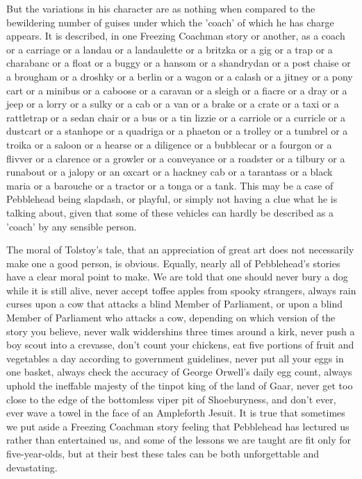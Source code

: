 But the variations in his character are as nothing when compared to the bewildering number of guises under which the 'coach' of which he has charge appears. It is described, in one Freezing Coachman story or another, as a coach or a carriage or a landau or a landaulette or a britzka or a gig or a trap or a charabanc or a float or a buggy or a hansom or a shandrydan or a post chaise or a brougham or a droshky or a berlin or a wagon or a calash or a jitney or a pony cart or a minibus or a caboose or a caravan or a sleigh or a fiacre or a dray or a jeep or a lorry or a sulky or a cab or a van or a brake or a crate or a taxi or a rattletrap or a sedan chair or a bus or a tin lizzie or a carriole or a curricle or a dustcart or a stanhope or a quadriga or a phaeton or a trolley or a tumbrel or a troika or a saloon or a hearse or a diligence or a bubblecar or a fourgon or a flivver or a clarence or a growler or a conveyance or a roadster or a tilbury or a runabout or a jalopy or an oxcart or a hackney cab or a tarantass or a black maria or a barouche or a tractor or a tonga or a tank. This may be a case of Pebblehead being slapdash, or playful, or simply not having a clue what he is talking about, given that some of these vehicles can hardly be described as a 'coach' by any sensible person.

The moral of Tolstoy's tale, that an appreciation of great art does not necessarily make one a good person, is obvious. Equally, nearly all of Pebblehead's stories have a clear moral point to make. We are told that one should never bury a dog while it is still alive, never accept toffee apples from spooky strangers, always rain curses upon a cow that attacks a blind Member of Parliament, or upon a blind Member of Parliament who attacks a cow, depending on which version of the story you believe, never walk widdershins three times around a kirk, never push a boy scout into a crevasse, don't count your chickens, eat five portions of fruit and vegetables a day according to government guidelines, never put all your eggs in one basket, always check the accuracy of George Orwell's daily egg count, always uphold the ineffable majesty of the tinpot king of the land of Gaar, never get too close to the edge of the bottomless viper pit of Shoeburyness, and don't ever, ever wave a towel in the face of an Ampleforth Jesuit. It is true that sometimes we put aside a Freezing Coachman story feeling that Pebblehead has lectured us rather than entertained us, and some of the lessons we are taught are fit only for five-year-olds, but at their best these tales can be both unforgettable and devastating.

